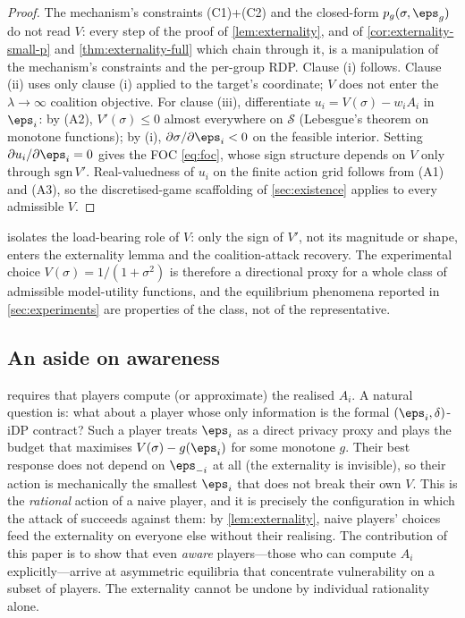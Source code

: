 \begin{proof}
The mechanism's constraints (C1)+(C2) and the closed-form $p_g(\sigma,\eps_g)$
do not read $V$: every step of the proof of \cref{lem:externality}, and of
\cref{cor:externality-small-p} and \cref{thm:externality-full} which
chain through it, is a manipulation of the mechanism's constraints and
the per-group RDP. Clause (i) follows. Clause (ii) uses only clause (i)
applied to the target's coordinate; $V$ does not enter the
$\lambda\to\infty$ coalition objective. For clause (iii), differentiate
$u_i = V(\sigma) - w_i A_i$ in $\eps_i$: by (A2), $V'(\sigma) \leq 0$
almost everywhere on $\mathcal S$ (Lebesgue's theorem on monotone
functions); by (i), $\partial\sigma/\partial\eps_i < 0$ on the feasible
interior. Setting $\partial u_i / \partial \eps_i = 0$ gives the FOC
\eqref{eq:foc}, whose sign structure depends on $V$ only through
$\mathrm{sgn}\,V'$. Real-valuedness of $u_i$ on the finite action grid
follows from (A1) and (A3), so the discretised-game scaffolding of
\cref{sec:existence} applies to every admissible $V$.
\end{proof}

 isolates the load-bearing role of $V$: only the
sign of $V'$, not its magnitude or shape, enters the externality lemma
and the coalition-attack recovery. The experimental choice $V(\sigma) =
1/(1+\sigma^2)$ is therefore a directional proxy for a whole class of
admissible model-utility functions, and the equilibrium phenomena
reported in \cref{sec:experiments} are properties of the class, not of
the representative.

\subsection{An aside on awareness}

 requires that players compute (or approximate) the
realised $A_i$. A natural question is: what about a player whose only
information is the formal $(\eps_i, \delta)$-iDP contract? Such a player
treats $\eps_i$ as a direct privacy proxy and plays the budget that
maximises $V(\sigma) - g(\eps_i)$ for some monotone $g$. Their best response
does not depend on $\eps_{-i}$ at all (the externality is invisible), so
their action is mechanically the smallest $\eps_i$ that does not break
their own $V$. This is the \emph{rational} action of a naive player, and it
is precisely the configuration in which the attack of
\citet{kaiser2026your} succeeds against them: by \cref{lem:externality},
naive players' choices feed the externality on everyone else without their
realising. The contribution of this paper is to show that even
\emph{aware} players---those who can compute $A_i$ explicitly---arrive at
asymmetric equilibria that concentrate vulnerability on a subset of players.
The externality cannot be undone by individual rationality alone.
